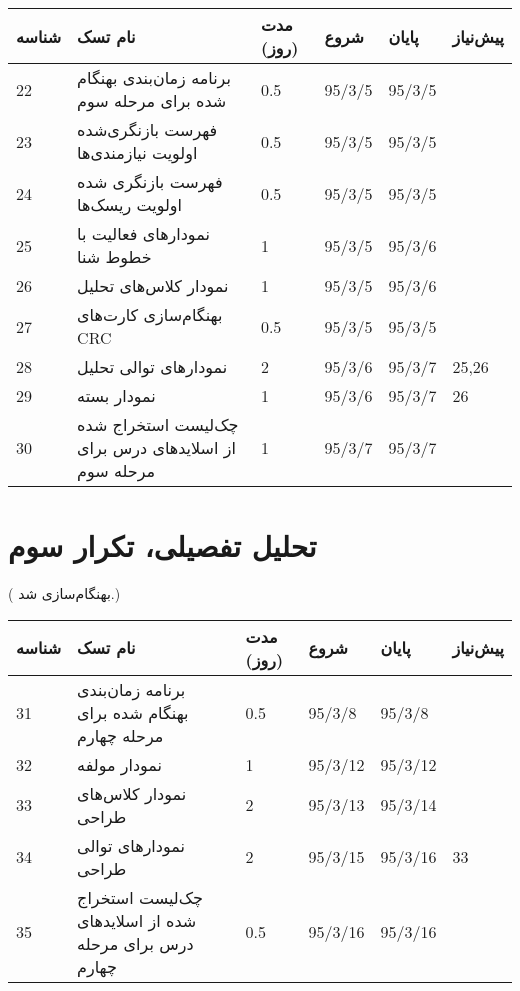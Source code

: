 \begin{tabular}[H]{ | l | l | l | l | l | l | }
	\hline
	شناسه & نام تسک & مدت (روز) & شروع & پایان & پیش‌نیاز    \\ \hline
	22 & برنامه زمان‌بندی  بهنگام شده برای مرحله سوم & 0.5   &   95/3/5 &   95/3/5 &      \\ \hline
	23 &  فهرست بازنگری‌شده اولویت نیازمندی‌ها & 0.5   &   95/3/5 &   95/3/5 &      \\ \hline
	24 &  فهرست بازنگری شده اولویت ریسک‌ها & 0.5   &   95/3/5 &   95/3/5 &      \\ \hline
	25 & نمودارهای فعالیت با خطوط شنا & 1   &   95/3/5 &   95/3/6 &      \\ \hline
	26 & نمودار کلاس‌های تحلیل & 1   &   95/3/5 &   95/3/6 &      \\ \hline
	27 & بهنگام‌سازی کارت‌های CRC & 0.5   &   95/3/5 &   95/3/5 &      \\ \hline
	28 & نمودارهای توالی تحلیل & 2   &   95/3/6 &   95/3/7 & 25,26    \\ \hline
	29 & نمودار بسته & 1   &   95/3/6 &   95/3/7 & 26    \\ \hline
	30 & چک‌‌لیست استخراج شده از اسلایدهای درس برای مرحله سوم & 1   &   95/3/7 &   95/3/7 &   \\ \hline
\end{tabular}

\section{تحلیل تفصیلی، تکرار سوم}	
({\color{red} بهنگام‌سازی شد.})

\begin{tabular}[H]{ | l | l | l | l | l | l | }
	\hline
	شناسه & نام تسک & مدت (روز) & شروع & پایان & پیش‌نیاز    \\ \hline
	31 & برنامه زمان‌بندی بهنگام شده برای مرحله چهارم & 0.5   &   95/3/8 &   95/3/8 &      \\ \hline
	32 & نمودار مولفه & 1 &   95/3/12 &   95/3/12 &      \\ \hline
	33 & نمودار کلاس‌های طراحی & 2   &   95/3/13 &   95/3/14 &      \\ \hline
	34 & نمودارهای توالی طراحی & 2   &   95/3/15 &   95/3/16 &   33   \\ \hline
	35 & چک‌‌لیست استخراج شده از اسلایدهای درس برای مرحله چهارم & 0.5   &   95/3/16 &   95/3/16 &    \\ \hline
\end{tabular}


\newpage

